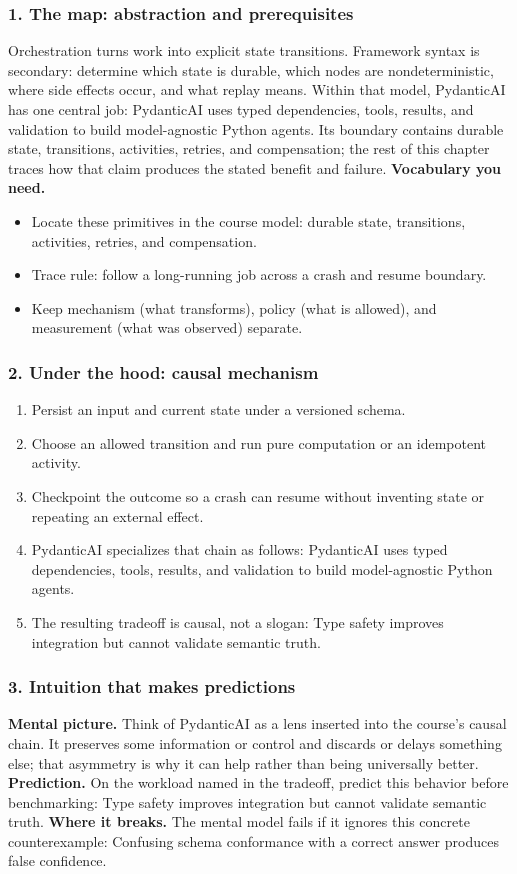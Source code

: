 \subsubsection*{1. The map: abstraction and prerequisites}
Orchestration turns work into explicit state transitions. Framework syntax is secondary: determine which state is durable, which nodes are nondeterministic, where side effects occur, and what replay means.
Within that model, PydanticAI has one central job: PydanticAI uses typed dependencies, tools, results, and validation to build model-agnostic Python agents. Its boundary contains durable state, transitions, activities, retries, and compensation; the rest of this chapter traces how that claim produces the stated benefit and failure.
\textbf{Vocabulary you need.}\begin{itemize}
\item Locate these primitives in the course model: durable state, transitions, activities, retries, and compensation.
\item Trace rule: follow a long-running job across a crash and resume boundary.
\item Keep mechanism (what transforms), policy (what is allowed), and measurement (what was observed) separate.
\end{itemize}
\subsubsection*{2. Under the hood: causal mechanism}\begin{enumerate}
\item Persist an input and current state under a versioned schema.
\item Choose an allowed transition and run pure computation or an idempotent activity.
\item Checkpoint the outcome so a crash can resume without inventing state or repeating an external effect.
\item PydanticAI specializes that chain as follows: PydanticAI uses typed dependencies, tools, results, and validation to build model-agnostic Python agents.
\item The resulting tradeoff is causal, not a slogan: Type safety improves integration but cannot validate semantic truth.
\end{enumerate}
\subsubsection*{3. Intuition that makes predictions}
\textbf{Mental picture.} Think of PydanticAI as a lens inserted into the course's causal chain. It preserves some information or control and discards or delays something else; that asymmetry is why it can help rather than being universally better.
\textbf{Prediction.} On the workload named in the tradeoff, predict this behavior before benchmarking: Type safety improves integration but cannot validate semantic truth.
\textbf{Where it breaks.} The mental model fails if it ignores this concrete counterexample: Confusing schema conformance with a correct answer produces false confidence.
